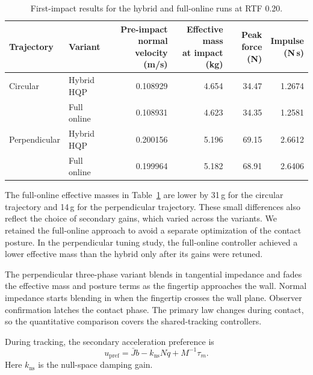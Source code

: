 \documentclass[12pt,a4paper]{article}
\begin{document}
\begin{table}[htbp]
  \centering
  \small
  \setlength{\tabcolsep}{5pt}
  \begin{tabular}{llrrrr}
    \toprule
    Trajectory & Variant & \shortstack{Pre-impact normal\\velocity (m/s)}
               & \shortstack{Effective mass\\at impact (kg)} & \shortstack{Peak force\\(N)}
               & \shortstack{Impulse\\(N\,s)} \\
    \midrule
    Circular      & Hybrid HQP  & 0.108929 & 4.654 & 34.47 & 1.2674 \\
                  & Full online & 0.108931 & 4.623 & 34.35 & 1.2581 \\
    Perpendicular & Hybrid HQP  & 0.200156 & 5.196 & 69.15 & 2.6612 \\
                  & Full online & 0.199964 & 5.182 & 68.91 & 2.6406 \\
    \bottomrule
  \end{tabular}
  \caption{First-impact results for the hybrid and full-online runs at RTF 0.20.}
  \label{tab:hybrid}
\end{table}

The full-online effective masses in Table~\ref{tab:hybrid} are lower by 31\,g
for the circular trajectory and 14\,g for the perpendicular trajectory. These
small differences also reflect the choice of secondary gains, which varied
across the variants. We retained the full-online approach to avoid a separate
optimization of the contact posture. In the perpendicular tuning study, the
full-online controller achieved a lower effective mass than the hybrid only
after its gains were retuned.

The perpendicular three-phase variant blends in tangential impedance and fades the
effective mass and posture terms as the fingertip approaches the wall. Normal
impedance starts blending in when the fingertip crosses the wall plane. Observer
confirmation latches the contact phase. The primary law changes during contact,
so the quantitative comparison covers the shared-tracking controllers.

During tracking, the secondary acceleration preference is
\begin{equation}
  u_{\mathrm{pref}} = \bar J b - k_{\mathrm{ns}} N \dot q + M^{-1} \tau_m .
\end{equation}
Here $k_{\mathrm{ns}}$ is the null-space damping gain.
\end{document}

